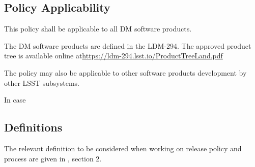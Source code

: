 \subsection{Policy Applicability} \label{sec:applicability}

This policy shall be applicable to all \gls{DM} software products.

The \gls{DM} software products are defined in the LDM-294. 
The approved product tree is available online at\url{https://ldm-294.lsst.io/ProductTreeLand.pdf}

The policy may also be applicable to other software products development by other \gls{LSST} subsystems.

In case 


\subsection{Definitions} \label{sec:defs}

The relevant definition to be considered when working on release policy and process are given in , section 2.
